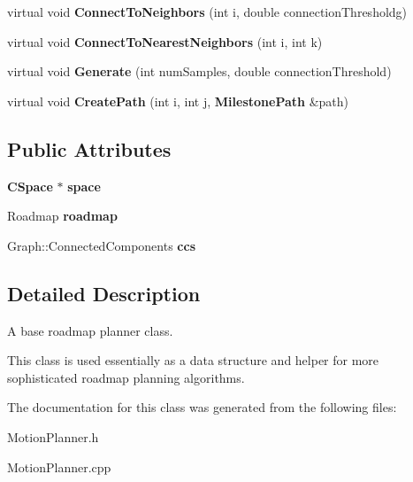\begin{DoxyCompactItemize}
\item 
virtual void {\bfseries Connect\+To\+Neighbors} (int i, double connection\+Thresholdg)\label{classRoadmapPlanner_a96299fcbac0584e4da421549e4dc4aa4}

\item 
virtual void {\bfseries Connect\+To\+Nearest\+Neighbors} (int i, int k)\label{classRoadmapPlanner_ace3fbd8f20850b03b8b7e5651217629b}

\item 
virtual void {\bfseries Generate} (int num\+Samples, double connection\+Threshold)\label{classRoadmapPlanner_a608617e92aff4d74b31d3bec8a22761b}

\item 
virtual void {\bfseries Create\+Path} (int i, int j, {\bf Milestone\+Path} \&path)\label{classRoadmapPlanner_a5299f2e53017179997f39dd393ad6780}

\end{DoxyCompactItemize}
\subsection*{Public Attributes}
\begin{DoxyCompactItemize}
\item 
{\bf C\+Space} $\ast$ {\bfseries space}\label{classRoadmapPlanner_a7b1d048f6e756c564b6bd80e21fd7d9d}

\item 
Roadmap {\bfseries roadmap}\label{classRoadmapPlanner_a4f4b54c0386df7f078bd7a217a86cd20}

\item 
Graph\+::\+Connected\+Components {\bfseries ccs}\label{classRoadmapPlanner_ae5b220a4f083b3faae9a2e365dc4e0bc}

\end{DoxyCompactItemize}


\subsection{Detailed Description}
A base roadmap planner class. 

This class is used essentially as a data structure and helper for more sophisticated roadmap planning algorithms. 

The documentation for this class was generated from the following files\+:\begin{DoxyCompactItemize}
\item 
Motion\+Planner.\+h\item 
Motion\+Planner.\+cpp\end{DoxyCompactItemize}
